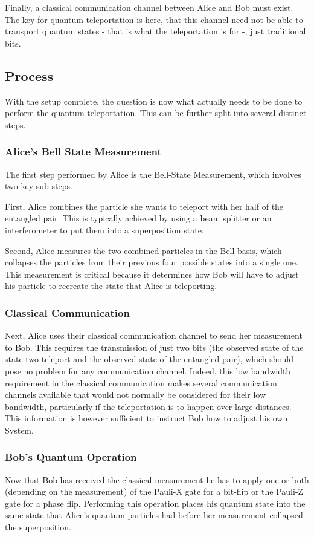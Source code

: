 Finally, a classical communication channel between Alice and Bob must exist.
The key for quantum teleportation is here, that this channel need not be able to transport quantum states - that is
what the teleportation is for -, just traditional bits.

\subsection{Process}\label{subsec:process}

With the setup complete, the question is now what actually needs to be done to perform the quantum teleportation.
This can be further split into several distinct steps.

\subsubsection{Alice's Bell State Measurement}
The first step performed by Alice is the Bell-State Measurement, which involves two key sub-steps.

First, Alice combines the particle she wants to teleport with her half of the entangled pair.
This is typically achieved by using a beam splitter or an interferometer to put them into a superposition state.

Second, Alice measures the two combined particles in the Bell basis\cite{some}, which collapses the particles from their
previous four possible states into a single one.
This measurement is critical because it determines how Bob will have to adjust his particle to recreate the state that
Alice is teleporting.
\subsubsection{Classical Communication}
Next, Alice uses their classical communication channel to send her measurement to Bob.
This requires the transmission of just two bits (the observed state of the state two teleport and the observed state of
the entangled pair), which should pose no problem for any communication channel.
Indeed, this low bandwidth requirement in the classical communication makes several communication channels available
that would not normally be considered for their low bandwidth, particularly if the teleportation is to happen over large
distances.
This information is however sufficient to instruct Bob how to adjust his own System.
\subsubsection{Bob's Quantum Operation}
Now that Bob has received the classical measurement he has to apply one or both (depending on the measurement) of the
Pauli-X gate\cite{} for a bit-flip or the Pauli-Z gate for a phase flip.
Performing this operation places his quantum state into the same state that Alice's quantum particles had before her
measurement collapsed the superposition.

